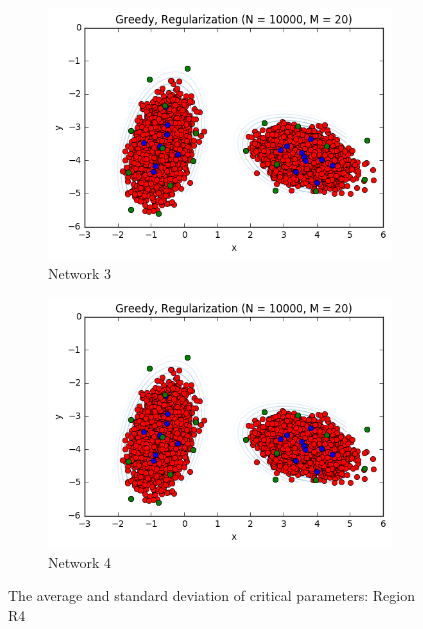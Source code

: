 \documentclass{article}
\begin{document}
\begin{figure}
\begin{subfigure}[b]{0.475\textwidth}
			\centering 
			\includegraphics[width=\textwidth]{OriginalGaussian_20_2g_reg}
			\caption[]%
			{{\small Network 3}}    
			\label{fig:mean and std of net34}
		\end{subfigure}
		\quad
		\begin{subfigure}[b]{0.475\textwidth}   
			\centering 
			\includegraphics[width=\textwidth]{OriginalGaussian_20_2g_reg}
			\caption[]%
			{{\small Network 4}}    
			\label{fig:mean and std of net44}
		\end{subfigure}
		\caption[ The average and standard deviation of critical parameters ]
		{\small The average and standard deviation of critical parameters: Region R4} 
		\label{fig:mean and std of nets}
	\end{figure}
	
	
	
	
	
\end{document}
